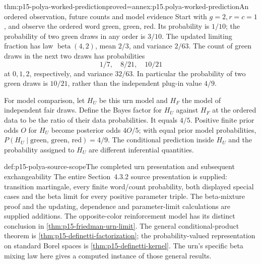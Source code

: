 \begin{hbtheorem}{thm:p15-polya-worked-prediction}{proved=annex:p15.polya-worked-prediction}{An ordered observation, future counts and model evidence}
Start with \(g=2,r=c=1\), and observe the ordered word green, green, red.
Its probability is \(1/10\); the probability of two green draws in
any order is \(3/10\).
The updated limiting fraction has law \(\operatorname{beta}(4,2)\),
mean \(2/3\), and variance \(2/63\).
The count of green draws in the next two draws has probabilities
\[
                    1/7,\quad 8/21,\quad 10/21
\]
at \(0,1,2\), respectively, and variance \(32/63\).
In particular the probability of two green draws is \(10/21\),
rather than the independent plug-in value \(4/9\).

For model comparison, let \(H_U\) be this urn model and \(H_F\)
the model of independent fair draws. Define the Bayes factor for
\(H_U\) against \(H_F\) at the ordered data to be the ratio of their
data probabilities. It equals \(4/5\).
Positive finite prior odds \(O\) for \(H_U\) become posterior odds
\(4O/5\); with equal prior model probabilities,
\(P(H_U\mid\text{green, green, red})=4/9\).
The conditional prediction inside \(H_U\) and the probability assigned
to \(H_U\) are different inferential quantities.
\end{hbtheorem}

\begin{proofboundary}{def:p15-polya-source-scope}{The completed urn presentation and subsequent exchangeability}
The entire Section~4.3.2 source presentation is supplied: transition
martingale, every finite word/count probability, both displayed special
cases and the beta limit for every positive parameter triple.
The beta-mixture proof and the updating, dependence and parameter-limit
calculations are supplied additions. The opposite-color reinforcement
model has its distinct conclusion in \cref{thm:p15-friedman-urn-limit}.
The general conditional-product theorem is
\cref{thm:p15-definetti-factorization}; the probability-valued
representation on standard Borel spaces is
\cref{thm:p15-definetti-kernel}. The urn's specific beta mixing law
here gives a computed instance of those general results.
\end{proofboundary}
